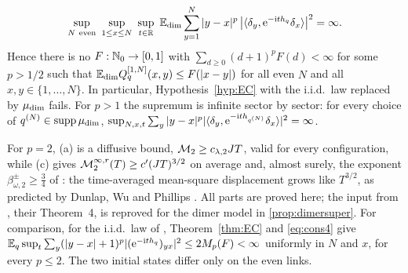 \begin{theorem}
\begin{enumerate}[label=(\alph*)]
\begin{equation}\label{eq:dimerLGTd}
  \sup_{N\ \mathrm{even}}\ \sup_{1\le x\le N}\ \sup_{t\in\R}\ \Edim\sum_{y=1}^N|y-x|^p\,
  \bigl|\langle\delta_y,\e^{-\ii t\hq}\delta_x\rangle\bigr|^2=\infty .
\end{equation}
Hence there is no $F:\mathbb{N}_0\to[0,1]$ with $\sum_{d\ge0}(d+1)^pF(d)<\infty$ for some $p>1/2$ such that
$\mathbb{E}_{\mathrm{dim}} Q^{[1,N]}_q(x,y)\le F(|x-y|)$ for all even $N$ and all $x,y\in\{1,\dots,N\}$.  In particular,
Hypothesis~\ref{hyp:EC} with the i.i.d.\ law replaced by $\mu_{\mathrm{dim}}$ fails.  For $p>1$ the supremum is
infinite sector by sector: for every choice of $q^{(N)}\in\operatorname{supp}\mu_{\mathrm{dim}}$,
$\sup_{N,x,t}\sum_y|y-x|^p|\langle\delta_y,\mathrm{e}^{-\mathrm{i} th_{q^{(N)}}}\delta_x\rangle|^2=\infty$.
\end{enumerate}
\end{theorem}

For $p=2$, (a) is a diffusive bound, $\mathcal{M}_2\ge c_{\lambda,2}JT$, valid for every configuration, while
(c) gives $\mathcal{M}^{\infty,r}_2(T)\ge c'(JT)^{3/2}$ on average and, almost surely, the exponent $\beta^\pm_{\omega,2}\ge\frac34$
of \cite[Thm.~4]{JSBS2003}: the time-averaged mean-square displacement grows like $T^{3/2}$, as predicted by Dunlap,
Wu and Phillips \cite{DWP1990}.  All parts are proved here; the input from \cite{JSBS2003}, their Theorem~4, is reproved
for the dimer model in \cref{prop:dimersuper}.  For comparison, for the i.i.d.\ law of
\cite{SKKM2017}, Theorem~\ref{thm:EC} and \eqref{eq:cons4} give
$\mathbb{E}_q\sup_t\sum_y(|y-x|+1)^p|(\mathrm{e}^{-\mathrm{i} th_{q}})_{yx}|^2\le2M_p(F)<\infty$ uniformly in $N$ and $x$, for
every $p\le2$.  The two initial states differ only on the even links.

